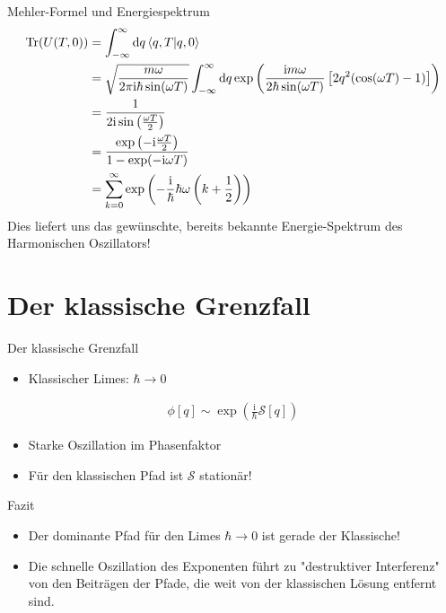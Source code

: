 \begin{frame}{Mehler-Formel und Energiespektrum}
\begin{align*}
\operatorname{Tr}(U(T,0)) &= \int_{-\infty}^{\infty} \dd q \braket{q,T}{q,0}	\\
&=  \sqrt{\frac{m\omega}{2\pi\mathrm{i}\hbar\sin(\omega T)}} \int_{-\infty}^{\infty} \dd q  \exp\left(\frac{\mathrm{i}m\omega}{2\hbar\sin(\omega T)}\left[2q^2(\cos(\omega T)- 1)\right] \right) \\
&= \frac{1}{2\mathrm{i}\sin\left(\frac{\omega T}{2}\right)} \\
&= \frac{\exp\left(-\mathrm{i}\frac{\omega T}{2}\right)}{1-\exp(-\mathrm{i}\omega T)}	\\
&= \sum_{k=0}^{\infty} \exp\left(-\frac{\mathrm{i}}{\hbar}\hbar\omega\left(k+\frac{1}{2}\right)\right)
\end{align*}
Dies liefert uns das gewünschte, bereits bekannte Energie-Spektrum des Harmonischen Oszillators!

\end{frame}


\section{Der klassische Grenzfall}
\begin{frame}{Der klassische Grenzfall}

\begin{itemize}
	\item Klassischer Limes: $\hbar \rightarrow 0$
\end{itemize}
\begin{align*}
	\phi[q] \sim \exp(\frac{\mathrm{i}}{\hbar} \mathcal{S}[q])
\end{align*}
\begin{itemize}
	\item Starke Oszillation im Phasenfaktor
	\item Für den klassischen Pfad ist $\mathcal{S}$ stationär!
\end{itemize} 
\begin{block}{\hfill Fazit \hfill}
\begin{itemize}
	\item Der dominante Pfad für den Limes $\hbar\rightarrow 0$ ist gerade der Klassische!
	\item  Die schnelle Oszillation des Exponenten führt zu "destruktiver Interferenz" von den Beiträgen der Pfade, die weit von der klassischen Lösung entfernt sind.	
\end{itemize}
\end{block}

\end{frame}

